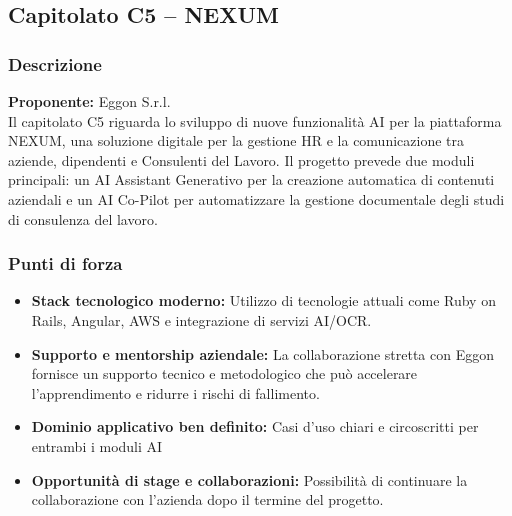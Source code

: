 \documentclass{article}
\begin{document}
	\subsection{Capitolato C5 – NEXUM}
	\subsubsection{Descrizione}
    \textbf{Proponente:} Eggon S.r.l.\\
	Il capitolato C5 riguarda lo sviluppo di nuove funzionalità AI per la piattaforma NEXUM, una soluzione digitale per la gestione HR e la comunicazione tra aziende, dipendenti e Consulenti del Lavoro. Il progetto prevede due moduli principali: un AI Assistant Generativo per la creazione automatica di contenuti aziendali e un AI Co-Pilot per automatizzare la gestione documentale degli studi di consulenza del lavoro.
	
	\subsubsection{Punti di forza}
	\begin{itemize}
		\item \textbf{Stack tecnologico moderno:} Utilizzo di tecnologie attuali come Ruby on Rails, Angular, AWS e integrazione di servizi AI/OCR.
		\item \textbf{Supporto e mentorship aziendale:} La collaborazione stretta con Eggon fornisce un supporto tecnico e metodologico che può accelerare l'apprendimento e ridurre i rischi di fallimento.
		\item \textbf{Dominio applicativo ben definito:} Casi d'uso chiari e circoscritti per entrambi i moduli AI
        \item \textbf{Opportunità di stage e collaborazioni:} Possibilità di continuare la collaborazione con l'azienda dopo il termine del progetto.
    \end{itemize}
	
\end{document}
